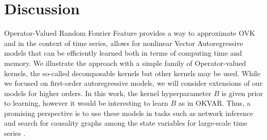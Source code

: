 \section{Discussion}
Operator-Valued Random Fourier Feature provides a way to approximate OVK and in
the context of time series, allows for nonlinear Vector Autoregressive models
that can be efficiently learned both in terms of computing time and memory. We
illustrate the approach with a simple family of Operator-valued kernels, the
so-called decomposable kernels but other kernels may be used. While we focused
on first-order autoregressive models, we will consider extensions of our models
for higher orders. In this work, the kernel hyperparameter $B$ is given prior
to learning, however it would be interesting to learn $B$ as in \acs{OKVAR}.
Thus, a promising perspective is to use these models in tasks such as network
inference and search for causality graphs among the state variables for
large-scale time series \cite{Lim2013,Lim2015}.


\chapterend
